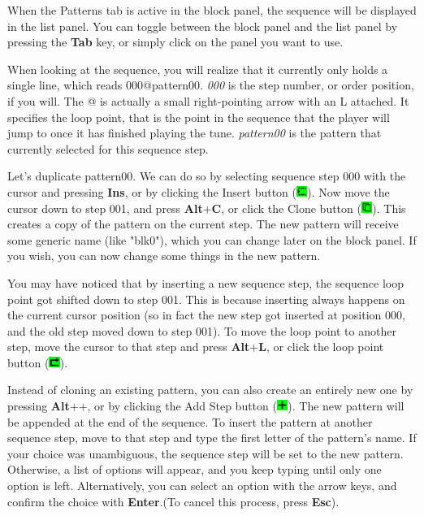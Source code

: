 \documentclass[12pt]{report}	%
\begin{document}
When the Patterns tab is active in the block panel, the sequence will be displayed in the list panel. You can toggle between the block panel and the list panel by pressing the \textbf{Tab} key, or simply click on the panel you want to use.

When looking at the sequence, you will realize that it currently only holds a single line, which reads 000@pattern00. \textit{000} is the step number, or order position, if you will. The @ is actually a small right-pointing arrow with an L attached. It specifies the loop point, that is the point in the sequence that the player will jump to once it has finished playing the tune. \textit{pattern00} is the pattern that currently selected for this sequence step.

Let's duplicate pattern00. We can do so by selecting sequence step 000 with the cursor and pressing \textbf{Ins}, or by clicking the Insert button ({\includegraphics[width=10pt]{button_insert}}). Now move the cursor down to step 001, and press \textbf{Alt\(\bm{+}\)C}, or click the Clone button ({\includegraphics[width=10pt]{button_clone}}). This creates a copy of the pattern on the current step. The new pattern will receive some generic name (like "blk0"), which you can change later on the block panel. If you wish, you can now change some things in the new pattern.

You may have noticed that by inserting a new sequence step, the sequence loop point got shifted down to step 001. This is because inserting always happens on the current cursor position (so in fact the new step got inserted at position 000, and the old step moved down to step 001). To move the loop point to another step, move the cursor to that step and press \textbf{Alt\(\bm{+}\)L}, or click the loop point button ({\includegraphics[width=10pt]{button_looppoint}}).

Instead of cloning an existing pattern, you can also create an entirely new one by pressing \textbf{Alt\(\bm{+}\)\(\bm{+}\)}, or by clicking the Add Step button ({\includegraphics[width=10pt]{button_plus}}). The new pattern will be appended at the end of the sequence. To insert the pattern at another sequence step, move to that step and type the first letter of the pattern's name. If your choice was unambiguous, the sequence step will be set to the new pattern. Otherwise, a list of options will appear, and you keep typing until only one option is left. Alternatively, you can select an option with the arrow keys, and confirm the choice with \textbf{Enter}.(To cancel this process, press \textbf{Esc}).
\end{document}
